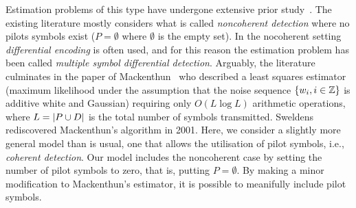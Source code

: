 \documentclass[a4paper,10pt]{article}
\begin{document}
Estimation problems of this type have undergone extensive prior study~\cite{Wilson1989,Makrakis1990,Liu1991,Mackenthun1994,Sweldens2001}.  The existing literature mostly considers what is called \emph{noncoherent detection} where no pilots symbols exist ($P = \emptyset$ where $\emptyset$ is the empty set).  In the nocoherent setting \emph{differential encoding} is often used, and for this reason the estimation problem has been called \emph{multiple symbol differential detection}.  Arguably, the literature culminates in the paper of Mackenthun~\cite{Mackenthun1994} who described a least squares estimator (maximum likelihood under the assumption that the noise sequence $\{w_i, i \in {\mathbb Z}\}$ is additive white and Gaussian) requiring only $O(L \log L)$ arithmetic operations, where $L = {\left| P \cup D \right|}$ is the total number of symbols transmitted.  Sweldens~\cite{Sweldens2001} rediscovered Mackenthun's algorithm in 2001.  Here, we consider a slightly more general model than is usual, one that allows the utilisation of pilot symbols, i.e., \emph{coherent detection}.  Our model includes the noncoherent case by setting the number of pilot symbols to zero, that is, putting $P = \emptyset$.  By making a minor modification to Mackenthun's estimator, it is possible to meanifully include pilot symbols.
\end{document}
